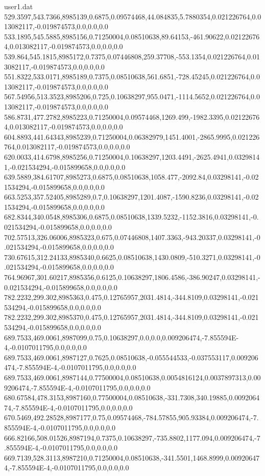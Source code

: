 \begin{filecontents}{user1.dat}
529.3597,543.7366,8985139,0.6875,0.09574468,44.084835,5.7880354,0.021226764,0.013082117,-0.019874573,0.0,0.0,0.0
533.1895,545.5885,8985156,0.71250004,0.08510638,89.64153,-461.90622,0.021226764,0.013082117,-0.019874573,0.0,0.0,0.0
539.864,545.1815,8985172,0.7375,0.07446808,259.37708,-553.1354,0.021226764,0.013082117,-0.019874573,0.0,0.0,0.0
551.8322,533.0171,8985189,0.7375,0.08510638,561.6851,-728.45245,0.021226764,0.013082117,-0.019874573,0.0,0.0,0.0
567.54956,513.3523,8985206,0.725,0.10638297,955.0471,-1114.5652,0.021226764,0.013082117,-0.019874573,0.0,0.0,0.0
586.8731,477.2782,8985223,0.71250004,0.09574468,1269.499,-1982.3395,0.021226764,0.013082117,-0.019874573,0.0,0.0,0.0
604.8893,441.64343,8985239,0.71250004,0.06382979,1451.4001,-2865.9995,0.021226764,0.013082117,-0.019874573,0.0,0.0,0.0
620.0033,414.6798,8985256,0.71250004,0.10638297,1203.4491,-2625.4941,0.03298141,-0.021534294,-0.015899658,0.0,0.0,0.0
639.5889,384.61707,8985273,0.6875,0.08510638,1058.477,-2092.84,0.03298141,-0.021534294,-0.015899658,0.0,0.0,0.0
663.5253,357.52405,8985289,0.7,0.10638297,1201.4087,-1590.8236,0.03298141,-0.021534294,-0.015899658,0.0,0.0,0.0
682.8344,340.0548,8985306,0.6875,0.08510638,1339.5232,-1152.3816,0.03298141,-0.021534294,-0.015899658,0.0,0.0,0.0
702.57513,326.06006,8985323,0.675,0.07446808,1407.3363,-943.20337,0.03298141,-0.021534294,-0.015899658,0.0,0.0,0.0
730.67615,312.24133,8985340,0.6625,0.08510638,1430.0809,-510.3271,0.03298141,-0.021534294,-0.015899658,0.0,0.0,0.0
764.96967,301.60217,8985356,0.6125,0.10638297,1806.4586,-386.90247,0.03298141,-0.021534294,-0.015899658,0.0,0.0,0.0
782.2232,299.302,8985363,0.475,0.12765957,2031.4814,-344.8109,0.03298141,-0.021534294,-0.015899658,0.0,0.0,0.0
782.2232,299.302,8985370,0.475,0.12765957,2031.4814,-344.8109,0.03298141,-0.021534294,-0.015899658,0.0,0.0,0.0
689.7533,469.0061,8987099,0.75,0.10638297,0.0,0.0,0.009206474,-7.855594E-4,-0.0107011795,0.0,0.0,0.0
689.7533,469.0061,8987127,0.7625,0.08510638,-0.055544533,-0.037553117,0.009206474,-7.855594E-4,-0.0107011795,0.0,0.0,0.0
689.7533,469.0061,8987144,0.77500004,0.08510638,0.0054816124,0.0037897313,0.009206474,-7.855594E-4,-0.0107011795,0.0,0.0,0.0
680.67584,478.3153,8987160,0.77500004,0.08510638,-331.7308,340.19885,0.009206474,-7.855594E-4,-0.0107011795,0.0,0.0,0.0
670.5469,492.28528,8987177,0.75,0.09574468,-784.57855,905.93384,0.009206474,-7.855594E-4,-0.0107011795,0.0,0.0,0.0
666.82166,508.01526,8987194,0.7375,0.10638297,-735.8802,1177.094,0.009206474,-7.855594E-4,-0.0107011795,0.0,0.0,0.0
669.7139,528.3113,8987210,0.71250004,0.08510638,-341.5501,1468.8999,0.009206474,-7.855594E-4,-0.0107011795,0.0,0.0,0.0

\end{filecontents}
